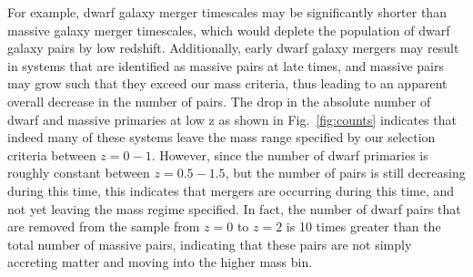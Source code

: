 \documentclass[twocolumn]{aastex631}
\newcommand{\kc}[1]{\textcolor{yellow}{\textbf{kc: #1}} }
\begin{document}


For example, dwarf galaxy merger timescales may be significantly shorter than massive galaxy merger timescales, which would deplete the population of dwarf galaxy pairs by low redshift. 
Additionally, early dwarf galaxy mergers may result in systems that are identified as massive pairs at late times, and massive pairs may grow such that they exceed our mass criteria, thus leading to an apparent overall decrease in the number of pairs. 
The drop in the absolute number of dwarf and massive primaries at low z as shown in Fig.~\ref{fig:counts} indicates that indeed many of these systems leave the mass range specified by our selection criteria between $z=0-1$. 
However, since the number of dwarf primaries is roughly constant between $z=0.5-1.5$, but the number of pairs is still decreasing during this time, this indicates that mergers are occurring during this time, and not yet leaving the mass regime specified. 
In fact, the number of dwarf pairs that are removed from the sample from $z=0$ to $z=2$ is 10 times greater than the total number of massive pairs, indicating that these pairs are not simply accreting matter and moving into the higher mass bin.
\end{document}
